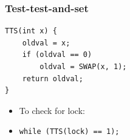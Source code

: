 \documentclass[10pt]{article}
\begin{document}
\subsubsection*{Test-test-and-set}
\begin{verbatim}
TTS(int x) {
    oldval = x;
    if (oldval == 0)
        oldval = SWAP(x, 1);
    return oldval;
}
\end{verbatim}
\begin{itemize}
    \item To check for lock:
    \item \texttt{while (TTS(lock) == 1);}
\end{itemize}
\end{document}
